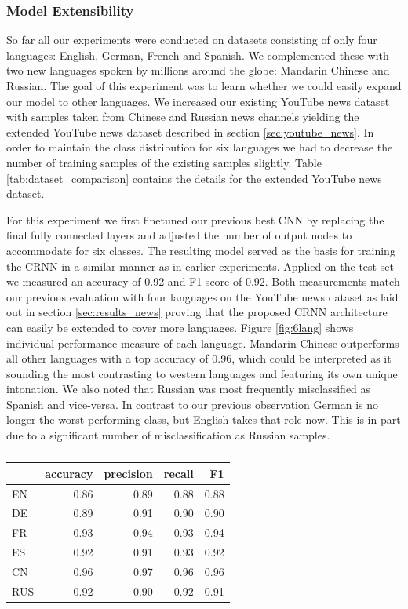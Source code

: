 \subsubsection{Model Extensibility} 
\label{sec:extensibility}
So far all our experiments were conducted on datasets consisting of only four languages: English, German, French and Spanish. We complemented these with two new languages spoken by millions around the globe: Mandarin Chinese and Russian. The goal of this experiment was to learn whether we could easily expand our model to other languages. 
We increased our existing YouTube news dataset with samples taken from Chinese and Russian news channels yielding the extended YouTube news dataset described in section \ref{sec:youtube_news}. In order to maintain the class distribution for six languages we had to decrease the number of training samples of the existing samples slightly. Table \ref{tab:dataset_comparison} contains the details for the extended YouTube news dataset.

For this experiment we first finetuned our previous best CNN by replacing the final fully connected layers and adjusted the number of output nodes to accommodate for six classes. The resulting model served as the basis for training the CRNN in a similar manner as in earlier experiments. Applied on the test set we measured an accuracy of 0.92 and F1-score of 0.92. Both measurements match our previous evaluation with four languages on the YouTube news dataset as laid out in section \ref{sec:results_news} proving that the proposed CRNN architecture can easily be extended to cover more languages. Figure \ref{fig:6lang} shows individual performance measure of each language. Mandarin Chinese outperforms all other languages with a top accuracy of 0.96, which could be interpreted as it sounding the most contrasting to western languages and featuring its own unique intonation. We also noted that Russian was most frequently misclassified as Spanish and vice-versa. In contrast to our previous observation German is no longer the worst performing class, but English takes that role now. This is in part due to a significant number of misclassification as Russian samples.

	\begin{table}[]
	\centering
	\begin{tabularx}{\textwidth}{lrrrr}
	\toprule
     & accuracy & precision & recall  & F1   \\ \midrule
EN   & 0.86     & 0.89      & 0.88    & 0.88 \\
DE   & 0.89     & 0.91      & 0.90    & 0.90 \\
FR   & 0.93     & 0.94      & 0.93    & 0.94 \\
ES   & 0.92     & 0.91      & 0.93    & 0.92 \\
CN   & 0.96     & 0.97      & 0.96    & 0.96 \\
RUS  & 0.92     & 0.90      & 0.92    & 0.91 \\

 	\bottomrule
	\end{tabularx}
	\caption{}
	\label{tab:6lang}
	\end{table}

